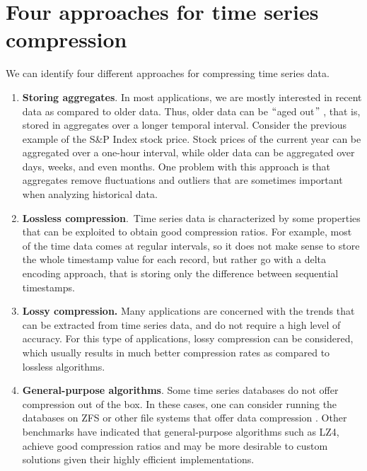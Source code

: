 \section{Four approaches for time series compression}
We can identify four different approaches for compressing time series data.
\begin{enumerate}
	\item \textbf{Storing aggregates}. In most applications, we are mostly interested in
	recent data as compared to older data. Thus, older data can be $``$aged out$"$ , that is,
	stored in aggregates over a longer temporal interval. Consider the previous example of
	the S\&P Index stock price. Stock prices of the current year can be aggregated over a
	one-hour interval, while older data can be aggregated over days, weeks, and even months.
	One problem with this approach is that aggregates remove fluctuations and outliers that
	are sometimes important when analyzing historical data.
	\item \textbf{Lossless compression}.\ Time series data is characterized by some properties
	that can be exploited to obtain good compression ratios.  For example, most of the time
	data comes at regular intervals, so it does not make sense to store the whole timestamp
	value for each record, but rather go with a delta encoding approach, that is storing only
	the difference between sequential timestamps.
	\item \textbf{Lossy compression. }Many applications are concerned with the trends that
	can be extracted from time series data, and do not require a high level of accuracy. For
	this type of applications, lossy compression can be considered, which usually results in
	much better compression rates as compared to lossless algorithms.
	\item \textbf{General-purpose algorithms}. Some time series databases do not offer
	compression out of the box. In these cases, one can consider running the databases on
	ZFS or other file systems that offer data compression \cite{A2019TimescaleDB}. Other
	benchmarks \cite{Danjou2016Timeseries} have indicated that general-purpose algorithms
	such as LZ4, achieve good compression ratios and may be more desirable to custom solutions
	given their highly efficient implementations.
\end{enumerate}